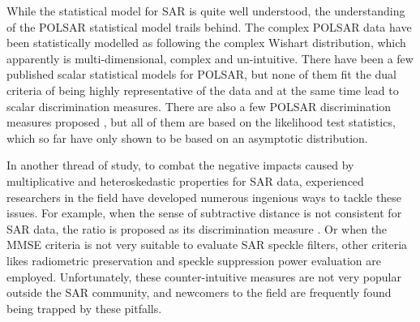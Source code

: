 
While
                the statistical model for SAR is quite well understood,
the
                understanding of the POLSAR statistical model trails behind.
The
                complex POLSAR data have been statistically modelled as
                following the complex Wishart distribution, which
                apparently is multi-dimensional, complex and
                un-intuitive.
There
                have been a few published scalar statistical models for
                POLSAR, \cite{Alberga_2008_IJRS_4129, Joughin_1994_TGRS_562, Lee_1994_TGRS_1017, Touzi_1996_TGRS_519, Barakat_1985_IJOptics, Eliyahu_1993_PhysRevE_2881, Brosseau_1995_AppliedOptics_4788} but none of them fit the dual criteria of being
                highly representative of the data and at the same time
                lead to scalar discrimination measures.
There
                are also a few POLSAR discrimination measures proposed \cite{Lee_1994_IJRS_2299, Kersten_2005_TGRS_519, Lee_2011_IGARSS_3740, Cao_2007_TGRS_3454, Conradsen_2003_TGRS_4},
                but all of them are based on the likelihood test
                statistics, which so far have only shown to be based on an
                asymptotic distribution.

 In
                another thread of study, to combat the negative
                impacts caused by multiplicative and heteroskedastic
                properties for SAR data, experienced researchers in the
                field have developed numerous ingenious ways to tackle
                these issues.
For
                example, when the sense of subtractive distance is not
                consistent for SAR data, the ratio is proposed as its
                discrimination measure \cite{Rignot_1993_TGRS_896}.
Or
                when the MMSE criteria is not very suitable to evaluate
                SAR speckle filters, other criteria likes radiometric
                preservation and speckle suppression power evaluation
                are employed. 
Unfortunately,
                these counter-intuitive measures are not very popular
                outside the SAR community, and newcomers to the field
                are frequently found being trapped by these pitfalls.


